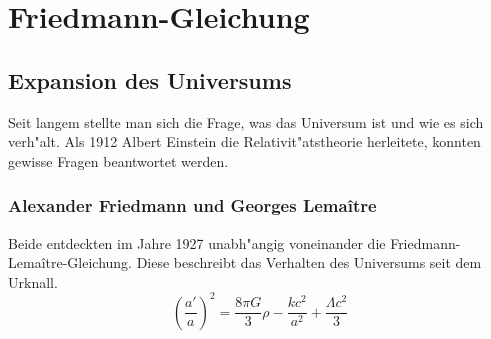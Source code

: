 \chapter{Friedmann-Gleichung\label{chapter:thema}}
\begin{refsection}
\printbibliography[heading=subbibliography]
\section{Expansion des Universums}
Seit langem stellte man sich die Frage, was das Universum ist und wie es sich verh"alt. Als 1912 Albert Einstein die Relativit"atstheorie herleitete, konnten gewisse Fragen beantwortet werden.
\subsection{Alexander Friedmann und Georges Lema\^{i}tre}
Beide entdeckten im Jahre 1927 unabh"angig voneinander die Friedmann-Lema\^{i}tre-Gleichung. Diese beschreibt das Verhalten des Universums seit dem Urknall. 
\begin{equation}
\left(\frac{a'}{a}\right) ^2 = \frac{8 \pi G}{3} \rho - \frac{k c^2}{a^2} + \frac{\Lambda c^2}{3}
\end{equation}

\end{refsection}
